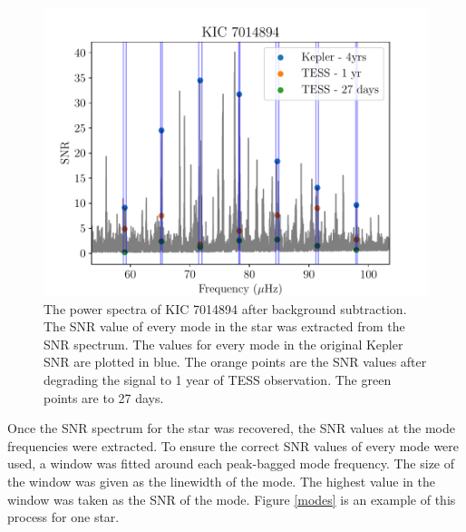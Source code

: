 \documentclass[a4paper,fleqn,usenatbib,useAMS]{mnras}
\begin{document}
\begin{figure}
	\centering
	\includegraphics[scale=0.6]{plot4_SNR7014894.pdf}
	\caption{The power spectra of KIC 7014894 after background subtraction. The SNR value of every mode in the star was extracted from the SNR spectrum. The values for every mode in the original Kepler SNR are plotted in blue. The orange points are the SNR values after degrading the signal to 1 year of TESS observation. The green points are to 27 days.}	
	\label{snr}
\end{figure}


Once the SNR spectrum for the star was recovered, the SNR values at the mode frequencies were extracted. To ensure the correct SNR values of every mode were used, a window was fitted around each peak-bagged mode frequency. The size of the window was given as the linewidth of the mode. The highest value in the window was taken as the SNR of the mode. Figure \ref{modes} is an example of this process for one star. 
\end{document}
